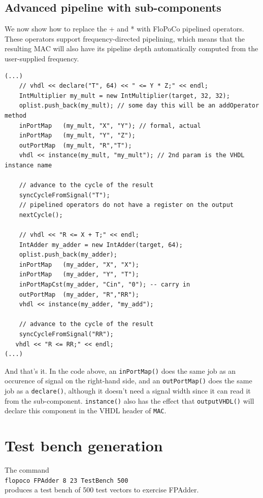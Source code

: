 \documentclass{article}
\begin{document}
\subsection{Advanced pipeline with sub-components}

We now show how to replace the + and * with FloPoCo pipelined
operators. These operators support frequency-directed pipelining,
which means that the resulting MAC will also have its pipeline depth
automatically computed from the user-supplied frequency.

\begin{verbatim}
(...)
	// vhdl << declare("T", 64) << " <= Y * Z;" << endl;
	IntMultiplier my_mult = new IntMultiplier(target, 32, 32);
	oplist.push_back(my_mult); // some day this will be an addOperator method
	inPortMap   (my_mult, "X", "Y"); // formal, actual
	inPortMap   (my_mult, "Y", "Z");
	outPortMap  (my_mult, "R","T");
	vhdl << instance(my_mult, "my_mult"); // 2nd param is the VHDL instance name

	// advance to the cycle of the result
	syncCycleFromSignal("T"); 
	// pipelined operators do not have a register on the output 
	nextCycle();

	// vhdl << "R <= X + T;" << endl;
	IntAdder my_adder = new IntAdder(target, 64);
	oplist.push_back(my_adder);
	inPortMap   (my_adder, "X", "X");
	inPortMap   (my_adder, "Y", "T");
	inPortMapCst(my_adder, "Cin", "0"); -- carry in
	outPortMap  (my_adder, "R","RR");
	vhdl << instance(my_adder, "my_add");

	// advance to the cycle of the result
	syncCycleFromSignal("RR"); 
   vhdl << "R <= RR;" << endl; 
(...)
\end{verbatim}


And that's it. In the code above, an \verb!inPortMap()! does the same
job as an occurence of signal on the right-hand side, and an \verb!outPortMap()! does the same job as
a \verb!declare()!, although it doesn't need a signal width since it
can read it from the sub-component. \verb!instance()! also has the
effect that \verb!outputVHDL()! will declare this component in the
VHDL header of \verb!MAC!.



\section{Test bench generation}

The command\\
 \texttt{flopoco FPAdder 8 23 TestBench 500} \\
produces a test bench of 500 test vectors to exercise FPAdder.
\end{document}
